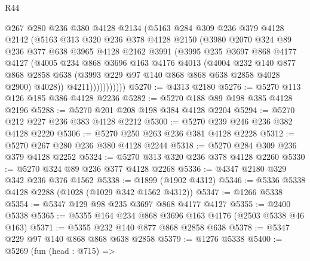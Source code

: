 \begin{lexlean}{R44}
\begin{coremodule}
                  @267
                  @280
                  @236
                  @380
                  @4128
                  @2134
                  (@5163
                    @284
                    @309
                    @236
                    @379
                    @4128
                    @2142
                    (@5163
                      @313
                      @320
                      @236
                      @378
                      @4128
                      @2150
                      (@3980
                        @2070
                        @324
                        @89
                        @236
                        @377
                        @638
                        @3965
                        @4128
                        @2162
                        @3991
                        (@3995
                          @235
                          @3697
                          @868
                          @4177
                          @4127
                          (@4005
                            @234
                            @868
                            @3696
                            @163
                            @4176
                            @4013
                            (@4004
                              @232
                              @140
                              @877
                              @868
                              @2858
                              @638
                              (@3993 @229 @97 @140 @868 @868 @638 @2858 @4028 @2900)
                              @4028))
                          @4211)))))))))))
@5270 := @4313 @2180
@5276 := @5270 @113 @126 @185 @386 @4128 @2236
@5282 := @5270 @188 @89 @198 @385 @4128 @2196
@5288 := @5270 @201 @208 @198 @384 @4128 @2204
@5294 := @5270 @212 @227 @236 @383 @4128 @2212
@5300 := @5270 @239 @246 @236 @382 @4128 @2220
@5306 := @5270 @250 @263 @236 @381 @4128 @2228
@5312 := @5270 @267 @280 @236 @380 @4128 @2244
@5318 := @5270 @284 @309 @236 @379 @4128 @2252
@5324 := @5270 @313 @320 @236 @378 @4128 @2260
@5330 := @5270 @324 @89 @236 @377 @4128 @2268
@5336 := @4347 @2180 @329 @342 @236 @376 @1562
@5338 := @1899 (@1902 @4312)
@5346 := @5336 @5338 @4128 @2288 (@1028 (@1029 @342 @1562 @4312))
@5347 := @1266 @5338
@5354 := @5347 @129 @98 @235 @3697 @868 @4177 @4127
@5355 := @2400 @5338
@5365 := @5355 @164 @234 @868 @3696 @163 @4176 (@2503 @5338 @46 @163)
@5371 := @5355 @232 @140 @877 @868 @2858 @638
@5378 := @5347 @229 @97 @140 @868 @868 @638 @2858
@5379 := @1276 @5338
@5400 := @5269
    (fun (head : @715) =>

\end{coremodule}
\end{lexlean}
